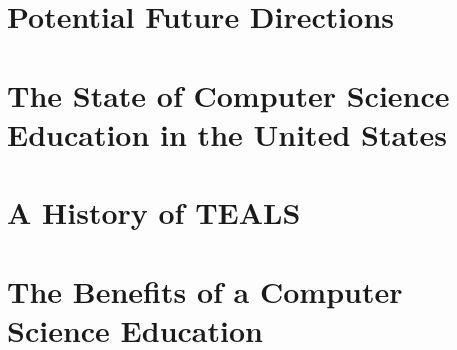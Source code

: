 \documentclass[10pt]{article}
\begin{document}






%
\section{Potential Future Directions}\label{sec:future}
%
\appendix
%
\section{The State of Computer Science Education in the United States}\label{sec:CSInUSA}
%
\section{A History of TEALS}\label{sec:TEALS}
%
\section{The Benefits of a Computer Science Education}\label{sec:benefits}

\printbibliography
\end{document}
